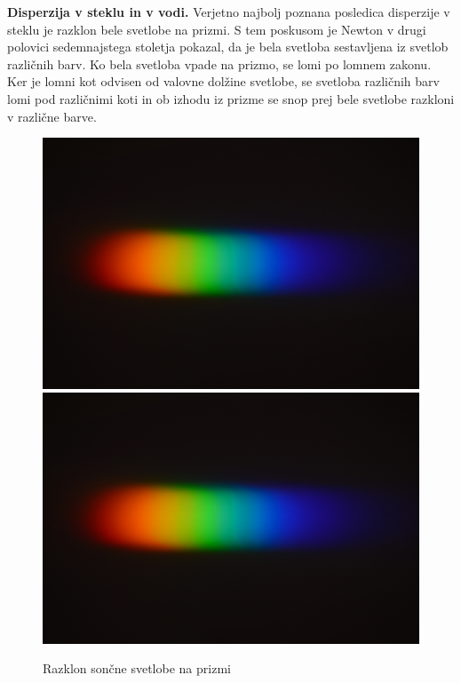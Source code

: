 \begin{example}{\bf Disperzija v steklu in v vodi.}
Verjetno najbolj poznana posledica disperzije v steklu je razklon bele svetlobe
na prizmi. S tem poskusom je Newton v drugi polovici sedemnajstega stoletja
pokazal, da je bela svetloba sestavljena iz svetlob različnih barv. Ko bela
svetloba vpade na prizmo, se lomi po lomnem zakonu. Ker je lomni kot odvisen
od valovne dolžine svetlobe, se svetloba različnih barv lomi pod različnimi
koti in ob izhodu iz prizme se snop prej bele svetlobe razkloni v različne
barve.
\begin{figure}[ht]
\centering
\includegraphics[width=7truecm]{slike/09_prizma.jpg}\hfill
\includegraphics[width=7truecm]{slike/09_prizma.jpg}
\caption{Razklon sončne svetlobe na prizmi}
\label{fig:09_prizma}
\end{figure}
 

\end{example}
